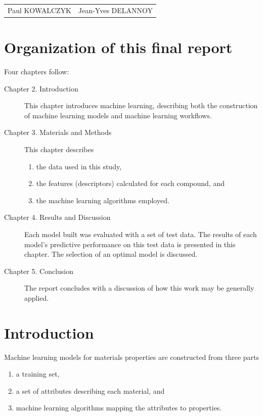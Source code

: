 \documentclass[10pt, letter]{report}
\renewcommand{\=}{\, =\, }
\newcommand{\+}{\, +\, }
\renewcommand{\-}{\, -\, }
\begin{document}
\vspace*{1cm}
\begin{tabular*}{5.03\textwidth}{lr}
Paul KOWALCZYK &\hspace*{9cm} Jean-Yves DELANNOY\\
\end{tabular*}

\tableofcontents

\chapter{Organization of this final report}

Four chapters follow:
\begin{description}
\item[Chapter 2. Introduction] This chapter introduces machine learning, describing both the construction of machine learning models and machine learning workflows.
\item[Chapter 3. Materials and Methods] This chapter describes
\begin{enumerate}
\item the data used in this study,
\item the features (descriptors) calculated for each compound, and
\item the machine learning algorithms employed.
\end{enumerate}
\item[Chapter 4. Results and Discussion] Each model built was evaluated with a set of test data. The results of each model's predictive performance on this test data is presented in this chapter. The selection of an optimal model is discussed.
\item[Chapter 5. Conclusion] The report concludes with a discussion of how this work may be generally applied.
\end{description}

\chapter{Introduction}

Machine learning models for materials properties are constructed from three parts
\begin{enumerate}
\item a training set,
\item a set of attributes describing each material, and
\item machine learning algorithms mapping the attributes to properties.
\end{enumerate}
\end{document}
